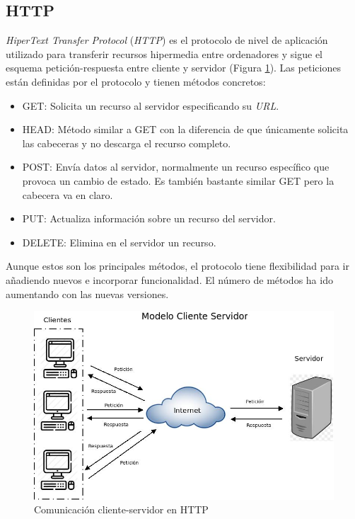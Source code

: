 \subsection{HTTP}
\label{subsec:http} 
\textit{HiperText Transfer Protocol} (\textit{HTTP}) es el protocolo de nivel de aplicación utilizado para transferir recursos hipermedia entre ordenadores y sigue el esquema petición-respuesta entre cliente y servidor (Figura \ref{fig:http}). 
Las peticiones están definidas por el protocolo y tienen métodos concretos: 
\begin{itemize}
    \item GET: Solicita un recurso al servidor especificando su \textit{URL}.
    \item HEAD: Método similar a GET con la diferencia de que únicamente solicita las cabeceras y no descarga el recurso completo.
    \item POST: Envía datos al servidor, normalmente un recurso específico que provoca un cambio de estado. Es también bastante similar GET pero la cabecera va en claro. 
    \item PUT: Actualiza información sobre un recurso del servidor. 
    \item DELETE: Elimina en el servidor un recurso.
\end{itemize}

Aunque estos son los principales métodos, el protocolo tiene flexibilidad para ir añadiendo nuevos e incorporar funcionalidad. El número de métodos ha ido aumentando con las nuevas versiones. 
\begin{figure}[h]
\centering
\includegraphics[scale=0.4]{img/http.jpeg}
\caption{Comunicación cliente-servidor en HTTP} \label{fig:http}
\end{figure}

